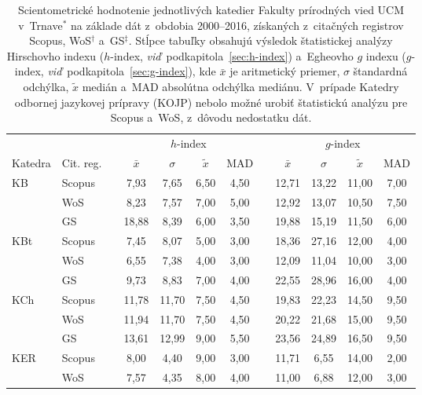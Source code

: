 \begin{table}
  \centering\small
  \caption[Hodnotenie FPV -- $h$-index a~$g$-index]%
  {Scientometrické hodnotenie jednotlivých katedier Fakulty prírodných vied UCM
    v~Trnave$^\ast$ na základe dát z~obdobia 2000--2016, získaných z~citačných
    registrov Scopus, WoS$^\dagger$ a~GS$^\ddagger$.  Stĺpce tabuľky obsahujú
    výsledok štatistickej analýzy Hirschovho indexu ($h$-index,
    \emph{viď}~podkapitola~\ref{sec:h-index}) a~Egheovho $g$ indexu ($g$-index,
    \emph{viď}~podkapitola~\ref{sec:g-index}), kde $\bar{x}$ je aritmetický
    priemer, $\sigma$ štandardná odchýlka, $\tilde{x}$ medián a~MAD absolútna
    odchýlka mediánu.  V~prípade Katedry odbornej jazykovej prípravy (KOJP)
    nebolo možné urobiť štatistickú analýzu pre Scopus a~WoS, z~dôvodu
    nedostatku dát.}
  \label{tab:3-staff.results}
  \begin{tabularx}{\textwidth}{XXp{1ex}ccccp{1ex}cccc}
    \toprule
    & & & \multicolumn{4}{c}{$h$-index} & & \multicolumn{4}{c}{$g$-index} \\
    \cmidrule{4-7}\cmidrule{9-12}
    Katedra & Cit. reg. & & $\bar{x}$ & $\sigma$ & $\tilde{x}$ & MAD & & $\bar{x}$ & $\sigma$ & $\tilde{x}$ & MAD \\
    \midrule
    KB   & Scopus & & 7,93  & 7,65  & 6,50  & 4,50  & & 12,71 & 13,22 & 11,00 & 7,00  \\
         & WoS    & & 8,23  & 7,57  & 7,00  & 5,00  & & 12,92 & 13,07 & 10,50 & 7,50  \\
         & GS     & & 18,88 & 8,39  & 6,00  & 3,50  & & 19,88 & 15,19 & 11,50 & 6,00  \\[1ex]
    KBt  & Scopus & & 7,45  & 8,07  & 5,00  & 3,00  & & 18,36 & 27,16 & 12,00 & 4,00  \\
         & WoS    & & 6,55  & 7,38  & 4,00  & 3,00  & & 12,09 & 11,04 & 10,00 & 3,00  \\
         & GS     & & 9,73  & 8,83  & 7,00  & 4,00  & & 22,55 & 28,96 & 16,00 & 4,00  \\[1ex]
    KCh  & Scopus & & 11,78 & 11,70 & 7,50  & 4,50  & & 19,83 & 22,23 & 14,50 & 9,50  \\
         & WoS    & & 11,94 & 11,70 & 7,50  & 4,50  & & 20,22 & 21,68 & 15,00 & 9,50  \\
         & GS     & & 13,61 & 12,99 & 9,00  & 5,50  & & 23,56 & 24,89 & 16,50 & 9,50  \\[1ex]
    KER  & Scopus & & 8,00  & 4,40  & 9,00  & 3,00  & & 11,71 & 6,55  & 14,00 & 2,00  \\
         & WoS    & & 7,57  & 4,35  & 8,00  & 4,00  & & 11,00 & 6,88  & 12,00 & 3,00  \\

\end{tabularx}
\end{table}
